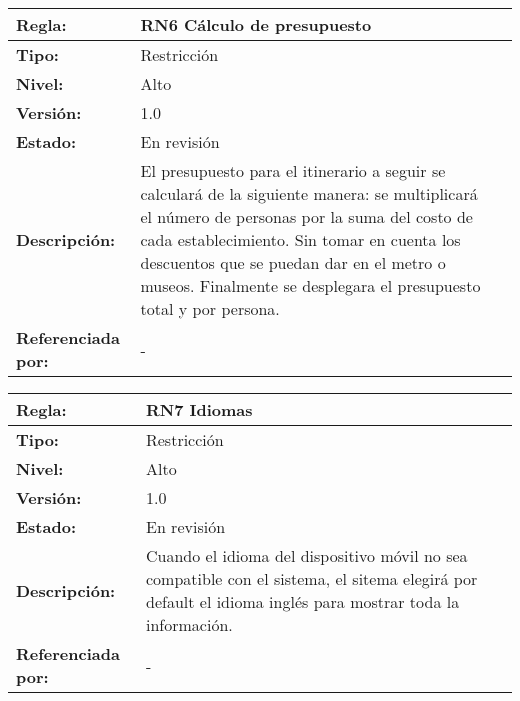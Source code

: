 \begin{table}[h]
    \begin{tabular}{|p{3.5cm}|p{10cm}|l|}
     \hline
     \textbf{Regla: } & RN6 C\'alculo de presupuesto\\ \hline
     \textbf{Tipo: } &  Restricci\'on\\ \hline
     \textbf{Nivel:} & Alto \\ \hline
     \textbf{Versi\'on: } & 1.0 \\ \hline
     \textbf{Estado: } & En revisi\'on \\ \hline
     \textbf{Descripci\'on: } & El presupuesto para el itinerario a seguir se calcular\'a de la siguiente
     manera: se multiplicar\'a el n\'umero de personas por la suma del costo de cada establecimiento. Sin tomar
     en cuenta los descuentos que se puedan dar en el metro o museos. Finalmente se desplegara el presupuesto total
     y por persona.\\ \hline 
     \textbf{Referenciada por: } & - \\
     \hline
   \end{tabular}
\end{table}

\begin{table}[h]
    \begin{tabular}{|p{3.5cm}|p{10cm}|l|}
     \hline
     \textbf{Regla: } & RN7 Idiomas\\ \hline
     \textbf{Tipo: } &  Restricci\'on\\ \hline
     \textbf{Nivel:} & Alto \\ \hline
     \textbf{Versi\'on: } & 1.0 \\ \hline
     \textbf{Estado: } & En revisi\'on \\ \hline
     \textbf{Descripci\'on: } & Cuando el idioma del dispositivo m\'ovil no sea compatible con el sistema, el sitema elegir\'a por default
     el idioma ingl\'es para mostrar toda la informaci\'on.\\ \hline 
     \textbf{Referenciada por: } & - \\
     \hline
   \end{tabular}
\end{table}